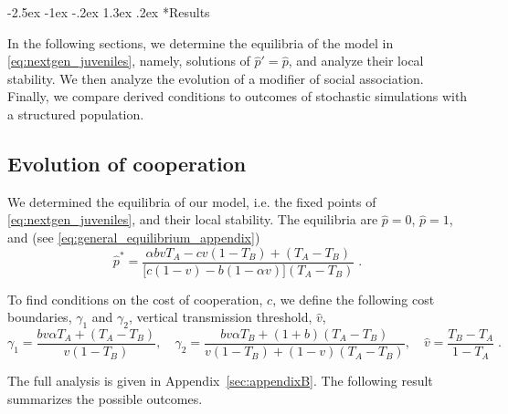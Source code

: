 \documentclass[12pt]{extarticle}
\makeatletter
\renewcommand\section{\@startsection {section}{1}{\z@}%
     {-2.5ex \@plus -1ex \@minus -.2ex}%
     {1.3ex \@plus.2ex}%
    {\Large\bfseries}}
\makeatother
\begin{document}
\section*{Results}

In the following sections, we determine the equilibria of the model in \autoref{eq:nextgen_juveniles}, namely, solutions of $\hat{p}' = \hat{p}$, and analyze their local stability.
We then analyze the evolution of a modifier of social association.
Finally, we compare derived conditions to outcomes of stochastic simulations with a structured population.

\subsection*{Evolution of cooperation}

We determined the equilibria of our model, i.e. the fixed points of \autoref{eq:nextgen_juveniles}, and their local stability.
The equilibria are $\hat p=0$, $\hat p=1$, and (see \autoref{eq:general_equilibrium_appendix})
\begin{equation} \label{eq:general_equilibrium}
  \hat{p}^* =  
  \frac{\alpha bvT_A - cv(1-T_B) + (T_A-T_B)}{\big[c(1-v) - b (1-\alpha v)\big] (T_A-T_B)} \;.
\end{equation}

To find conditions on the cost of cooperation, $c$, we define the following cost boundaries, $\gamma_1$ and $\gamma_2$, vertical transmission threshold, $\hat v$,
\begin{equation} \label{eq:cost_boundaries_v_threshold} 
\gamma_1 = \frac{b v \alpha T_A + (T_A - T_B)}{v(1-T_B)}, \quad
\gamma_2 = \frac{b v \alpha T_B + (1+b) (T_A - T_B)}{v(1-T_B) + (1-v)(T_A-T_B)}, \quad
\hat v = \frac{T_B - T_A}{1-T_A} \;.
\end{equation}

The full analysis is given in Appendix~\ref{sec:appendixB}.
The following result summarizes the possible outcomes.
\\
\end{document}
